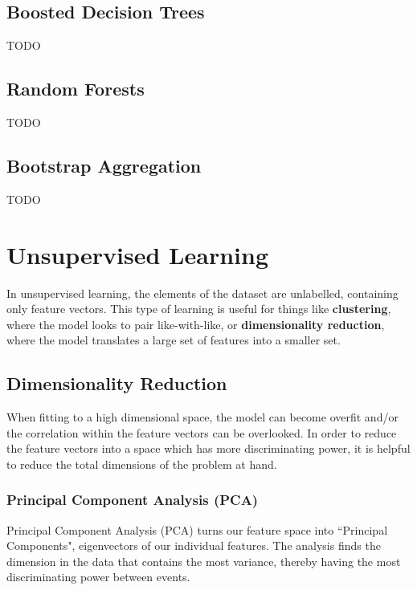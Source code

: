 \subsection{Boosted Decision Trees}
TODO
\subsection{Random Forests}
TODO
\subsection{Bootstrap Aggregation}
TODO


\section{Unsupervised Learning}
In unsupervised learning, the elements of the dataset are unlabelled, containing only feature vectors. This type of learning is useful for things like \textbf{clustering}, where the model looks to pair like-with-like, or \textbf{dimensionality reduction}, where the model translates a large set of features into a smaller set.


\subsection{Dimensionality Reduction}\label{dim_red}
When fitting to a high dimensional space, the model can become overfit and/or the correlation within the feature vectors can be overlooked. In order to reduce the feature vectors into a space which has more discriminating power, it is helpful to reduce the total dimensions of the problem at hand.
\subsubsection{Principal Component Analysis (PCA)}
Principal Component Analysis (PCA) turns our feature space into ``Principal Components", eigenvectors of our individual features. The analysis finds the dimension in the data that contains the most variance, thereby having the most discriminating power between events.

